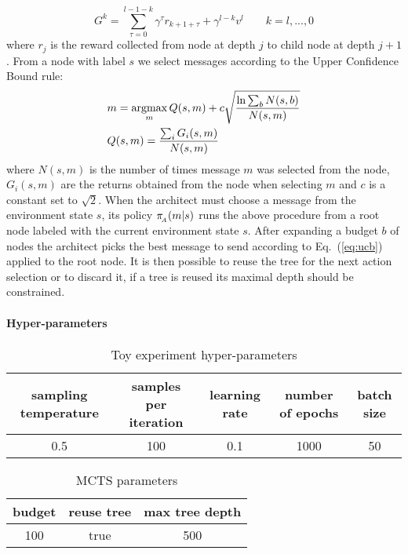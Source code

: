 \begin{equation}
    G^k=\sum_{\tau=0}^{l-1-k}\gamma^\tau r_{k+1+\tau} + \gamma^{l-k}v^l \qquad k=l,...,0
\end{equation}
where $r_j$ is the reward collected from node at depth $j$ to child node at depth $j+1$.  
From a node with label $s$ we select messages according to the Upper Confidence Bound rule: 
\begin{equation}
\label{eq:ucb}
\begin{split}
&m = \operatorname*{argmax}_m Q(s,m) + c \sqrt{\frac{\ln \sum_b N(s,b)}{N(s,m)}}\\
&Q(s,m) = \frac{\sum_iG_i(s,m)}{N(s,m)}
\end{split}
\end{equation}
where $N(s,m)$ is the number of times message $m$ was selected from the node, $G_i(s,m)$ are the returns obtained from the node when selecting $m$ and $c$ is a constant set to $\sqrt{2}$.
When the architect must choose a message from the environment state $s$, its policy $\pi_{\!_A}(m|s)$ runs the above procedure from a root node labeled with the current environment state $s$. After expanding a budget $b$ of nodes the architect picks the best message to send according to Eq.~(\ref{eq:ucb}) applied to the root node. It is then possible to reuse the tree for the next action selection or to discard it, if a tree is reused its maximal depth should be constrained.

\paragraph{Hyper-parameters}\textbf{ }
\begin{table}[h!]
    \centering
    \begin{tabular}{ccccc}
         sampling temperature & samples per iteration & learning rate & number of epochs & batch size\\
         \hline 
         0.5 & 100 & 0.1 & 1000 & 50
    \end{tabular}
    \caption{Toy experiment hyper-parameters}
\end{table}


\begin{table}[h!]
    \centering
    \begin{tabular}{ccc}
         budget & reuse tree & max tree depth \\
         \hline
         100 & true & 500  
    \end{tabular}
    \caption{MCTS parameters}
\end{table}

